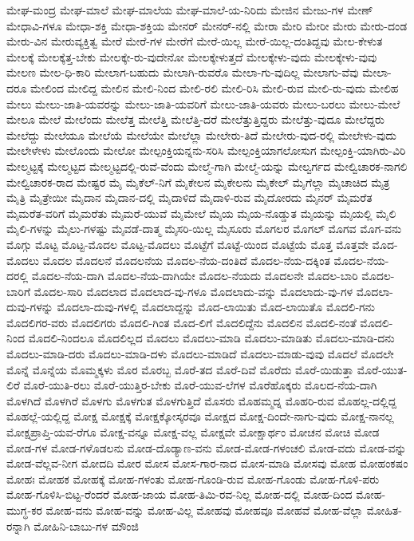 {ಮೇಘ-ಮಂದ್ರ
ಮೇಘ-ಮಾಲೆ
ಮೇಘ-ಮಾಲೆಯ
ಮೇಘ-ಮಾಲೆ-ಯ-ನಿರಿದು
ಮೇಜಿನ
ಮೇಜು-ಗಳ
ಮೇಣ್
ಮೇಧಾವಿ-ಗಳೂ
ಮೇಧಾ-ಶಕ್ತಿ
ಮೇಧಾ-ಶಕ್ತಿಯ
ಮೇನರ್
ಮೇನರ್-ನಲ್ಲಿ
ಮೇರಾ
ಮೇರಿ
ಮೇರೀ
ಮೇರು
ಮೇರು-ದಂಡ
ಮೇರು-ವಿನ
ಮೇರುವ್ಯಕ್ತಿತ್ವ
ಮೇರೆ
ಮೇರೆ-ಗಳ
ಮೇರೆಗೆ
ಮೇರೆ-ಯಿಲ್ಲ
ಮೇರೆ-ಯಿಲ್ಲ-ದಂತಿದ್ದವು
ಮೇಲ-ಕೇಳುತ
ಮೇಲಕ್ಕೆ
ಮೇಲಕ್ಕೆತ್ತ-ಬೇಕು
ಮೇಲಕ್ಕೇ-ರು-ವುದೇನೋ
ಮೇಲಕ್ಕೇಳುತ್ತದೆ
ಮೇಲಕ್ಕೇಳು-ವುದು
ಮೇಲಕ್ಕೇಳು-ವುವು
ಮೇಲಣ
ಮೇಲ-ಧಿ-ಕಾರಿ
ಮೇಲಾಗ-ಬಹುದು
ಮೇಲಾಗಿ-ರುವರೊ
ಮೇಲಾ-ಗು-ವುದಿಲ್ಲ
ಮೇಲಾಗು-ವೆವು
ಮೇಲಾ-ದರೂ
ಮೇಲಿಂದ
ಮೇಲಿದ್ದ
ಮೇಲಿನ
ಮೇಲಿ-ನಿಂದ
ಮೇಲಿ-ರಲಿ
ಮೇಲಿ-ರಿಸಿ
ಮೇಲಿ-ರುವ
ಮೇಲಿ-ರು-ವುದು
ಮೇಲಿಹ
ಮೇಲು
ಮೇಲು-ಜಾತಿ-ಯವರನ್ನು
ಮೇಲು-ಜಾತಿ-ಯವರಿಗೆ
ಮೇಲು-ಜಾತಿ-ಯವರು
ಮೇಲು-ಬರಲು
ಮೇಲು-ಮೇಲೆ
ಮೇಲೂ
ಮೇಲೆ
ಮೇಲೆಂದು
ಮೇಲೆತ್ತ
ಮೇಲೆತ್ತಿ
ಮೇಲೆತ್ತಿ-ದರೆ
ಮೇಲೆತ್ತುತ್ತಿದ್ದರು
ಮೇಲೆತ್ತು-ವುದೂ
ಮೇಲೆದ್ದರು
ಮೇಲೆದ್ದು
ಮೇಲೆಯೂ
ಮೇಲೆಯೆ
ಮೇಲೆಯೇ
ಮೇಲೆಲ್ಲಾ
ಮೇಲೇರು-ತಿದೆ
ಮೇಲೇರು-ವುದ-ರಲ್ಲಿ
ಮೇಲೇಳು-ವುದು
ಮೇಲೇಳೇಳು
ಮೇಲೊಂದು
ಮೇಲೋ
ಮೇಲ್ಪಂಕ್ತಿಯನ್ನನು-ಸರಿಸಿ
ಮೇಲ್ಪಂಕ್ತಿಯಾಗಲೋಸುಗ
ಮೇಲ್ಪಂಕ್ತಿ-ಯಾಗಿರು-ವಿರಿ
ಮೇಲ್ಮಟ್ಟಕ್ಕೆ
ಮೇಲ್ಮಟ್ಟದ
ಮೇಲ್ಮಟ್ಟದಲ್ಲಿ-ರುವೆ-ವೆಂದು
ಮೇಲ್ಮೆ-ಗಾಗಿ
ಮೇಲ್ಮೆ-ಯನ್ನು
ಮೇಲ್ವರ್ಗದ
ಮೇಲ್ವಿಚಾರಕ-ನಾಗಲಿ
ಮೇಲ್ವಿಚಾರಕ-ರಾದ
ಮೇಷ್ಟರ
ಮೈ
ಮೈಕೆಲ್-ನಿಗೆ
ಮೈಕೇಲನ
ಮೈಕೇಲನು
ಮೈಕೇಲ್
ಮೈಗೆಲ್ಲಾ
ಮೈಚಾಚಿದ
ಮೈತ್ರ
ಮೈತ್ರಿ
ಮೈತ್ರೇಯೀ
ಮೈದಾನ
ಮೈದಾನ-ದಲ್ಲಿ
ಮೈದಾಳಿದೆ
ಮೈದಾಳಿ-ರುವ
ಮೈದೋರದು
ಮೈನರ್
ಮೈಮರೆತ
ಮೈಮರೆತ-ವರಿಗೆ
ಮೈಮರೆತು
ಮೈಮರೆ-ಯುವೆ
ಮೈಮೇಲೆ
ಮೈಯ
ಮೈಯ-ನೊಡ್ಡುತ
ಮೈಯನ್ನು
ಮೈಯಲ್ಲಿ
ಮೈಲಿ
ಮೈಲಿ-ಗಳನ್ನು
ಮೈಲು-ಗಳಷ್ಟು
ಮೈವಡೆ-ದಾತ್ಮ
ಮೈಸರಿ-ಯಿಲ್ಲ
ಮೈಸೂರು
ಮೊಗಲರ
ಮೊಗಲ್
ಮೊಗವ
ಮೊಗ-ವನು
ಮೊಗ್ಗು
ಮೊಟ್ಟ
ಮೊಟ್ಟ-ಮೊದಲ
ಮೊಟ್ಟ-ಮೊದಲು
ಮೊಟ್ಟೆಗೆ
ಮೊಟ್ಟೆ-ಯಿಂದ
ಮೊಟ್ಟೆಯೆ
ಮೊತ್ತ
ಮೊತ್ತವೇ
ಮೊದ-ಮೊದಲು
ಮೊದಲ
ಮೊದಲನೆ
ಮೊದಲನೆಯ
ಮೊದಲ-ನೆಯ-ದಂತಿದೆ
ಮೊದಲ-ನೆಯ-ದಕ್ಕಿಂತ
ಮೊದಲ-ನೆಯ-ದರಲ್ಲಿ
ಮೊದಲ-ನೆಯ-ದಾಗಿ
ಮೊದಲ-ನೆಯ-ದಾಗಿಯೇ
ಮೊದಲ-ನೆಯದು
ಮೊದಲನೇ
ಮೊದಲ-ಬಾರಿ
ಮೊದಲ-ಬಾರಿಗೆ
ಮೊದಲ-ಸಾರಿ
ಮೊದಲಾದ
ಮೊದಲಾದ-ವು-ಗಳೂ
ಮೊದಲಾದು-ವನ್ನು
ಮೊದಲಾದು-ವು-ಗಳ
ಮೊದಲಾ-ದುವು-ಗಳನ್ನು
ಮೊದಲಾ-ದುವು-ಗಳಲ್ಲಿ
ಮೊದಲಾದ್ದನ್ನು
ಮೊದ-ಲಾಯಿತು
ಮೊದ-ಲಾಯಿತೊ
ಮೊದಲಿ-ಗನು
ಮೊದಲಿಗರ-ವರು
ಮೊದಲಿಗರು
ಮೊದಲಿ-ಗಿಂತ
ಮೊದ-ಲಿಗೆ
ಮೊದಲಿದ್ದೆನು
ಮೊದಲಿನ
ಮೊದಲಿ-ನಂತೆ
ಮೊದಲಿ-ನಿಂದ
ಮೊದಲಿ-ನಿಂದಲೂ
ಮೊದಲಿಲ್ಲದ
ಮೊದಲು
ಮೊದಲು-ಮಾಡಿ
ಮೊದಲು-ಮಾಡಿತು
ಮೊದಲು-ಮಾಡಿ-ದನು
ಮೊದಲು-ಮಾಡಿ-ದರು
ಮೊದಲು-ಮಾಡಿ-ದಳು
ಮೊದಲು-ಮಾಡಿದೆ
ಮೊದಲು-ಮಾಡು-ವುವು
ಮೊದಲೆ
ಮೊದಲೇ
ಮೊನ್ನೆ
ಮೊನ್ನೆಯ
ಮೊಮ್ಮಕ್ಕಳು
ಮೊರ
ಮೊರಬ್ಬ
ಮೊರೆ-ತದ
ಮೊರೆ-ದಿವೆ
ಮೊರೆದು
ಮೊರೆ-ಯಿಡುತ್ತಾ
ಮೊರೆ-ಯುತ-ಲಿರೆ
ಮೊರೆ-ಯುತಿ-ರಲು
ಮೊರೆ-ಯುತ್ತಿರ-ಬೇಕು
ಮೊರೆ-ಯುವ-ಲೆಗಳ
ಮೊರೆಹೊಕ್ಕರು
ಮೊಲದ-ನೆಯ-ದಾಗಿ
ಮೊಳಗಿದೆ
ಮೊಳಗಿರೆ
ಮೊಳಗು
ಮೊಳಗುತ
ಮೊಳಗುತ್ತಿದೆ
ಮೊಸರು
ಮೊಹಮ್ಮದ್ನ
ಮೊಹರಿ-ರುವ
ಮೊಹಲ್ಲ-ದಲ್ಲಿದ್ದ
ಮೊಹಲ್ಲೆ-ಯಲ್ಲಿದ್ದ
ಮೋಕ್ಷ
ಮೋಕ್ಷಕ್ಕೆ
ಮೋಕ್ಷಕ್ಕೋಸ್ಕರವೂ
ಮೋಕ್ಷದ
ಮೋಕ್ಷ-ದಿಂದೇ-ನಾಗು-ವುದು
ಮೋಕ್ಷ-ನಾನಲ್ಲ
ಮೋಕ್ಷಪ್ರಾಪ್ತಿ-ಯವ-ರೆಗೂ
ಮೋಕ್ಷ-ವನ್ನೂ
ಮೋಕ್ಷ-ವಲ್ಲ
ಮೋಕ್ಷವೇ
ಮೋಕ್ಷಾರ್ಥಂ
ಮೋಚನ
ಮೋಚಿ
ಮೋಡ
ಮೋಡ-ಗಳ
ಮೋಡ-ಗಳೊಡಲನು
ಮೋಡ-ದೊಡ್ಯಾಣ-ವನು
ಮೋಡ-ಮೋಡ-ಗಳಂಚಲಿ
ಮೋಡ-ವದು
ಮೋಡ-ವನ್ನು
ಮೋಡ-ವೆಲ್ಲವ-ನೀಗ
ಮೋದದಿ
ಮೋರ
ಮೋಸ
ಮೋಸ-ಗಾರ-ನಾದ
ಮೋಸ-ಮಾಡಿ
ಮೋಸವು
ಮೋಹ
ಮೋಹಂಕಷಂ
ಮೋಹಃ
ಮೋಹಕ
ಮೋಹಕ್ಕೆ
ಮೋಹ-ಗಳಂತು
ಮೋಹ-ಗೊಂಡಿ-ರುವ
ಮೋಹ-ಗೊಂಡು
ಮೋಹ-ಗೊಳಿ-ಪರು
ಮೋಹ-ಗೊಳಿಸಿ-ಬಿಟ್ಟ-ರೆಂದರೆ
ಮೋಹ-ಜಾಯ
ಮೋಹ-ತಿಮಿ-ರವ-ನಿಲ್ಲ
ಮೋಹ-ದಲ್ಲಿ
ಮೋಹ-ದಿಂದ
ಮೋಹ-ಮುಗ್ಧ-ಕರ
ಮೋಹ-ವನು
ಮೋಹ-ವನ್ನು
ಮೋಹ-ವಿಲ್ಲ
ಮೋಹವು
ಮೋಹವೂ
ಮೋಹವೆ
ಮೋಹ-ವೆಲ್ಲಾ
ಮೋಹಿತ-ರನ್ನಾಗಿ
ಮೋಹಿನಿ-ಬಾಬು-ಗಳ
ಮೌಂಜಿ
}
